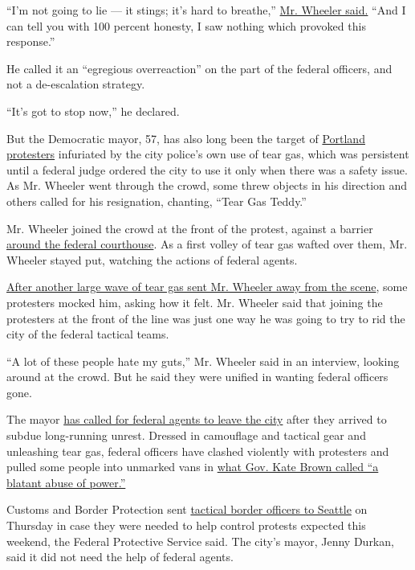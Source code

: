 ``I'm not going to lie --- it stings; it's hard to breathe,''
\href{https://twitter.com/ByMikeBaker/status/1286186731763412993}{Mr.
Wheeler said.} ``And I can tell you with 100 percent honesty, I saw
nothing which provoked this response.''

He called it an ``egregious overreaction'' on the part of the federal
officers, and not a de-escalation strategy.

``It's got to stop now,'' he declared.

But the Democratic mayor, 57, has also long been the target of
\href{https://www.nytimes.com/article/portland-protests-explained-protesters.html}{Portland
protesters} infuriated by the city police's own use of tear gas, which
was persistent until a federal judge ordered the city to use it only
when there was a safety issue. As Mr. Wheeler went through the crowd,
some threw objects in his direction and others called for his
resignation, chanting, ``Tear Gas Teddy.''

Mr. Wheeler joined the crowd at the front of the protest, against a
barrier
\href{https://www.nytimes.com/2020/07/22/us/portland-protests-courthouse.html}{around
the federal courthouse}. As a first volley of tear gas wafted over them,
Mr. Wheeler stayed put, watching the actions of federal agents.

\href{https://twitter.com/ByMikeBaker/status/1286194497559252992}{After
another large wave of tear gas sent Mr. Wheeler away from the scene},
some protesters mocked him, asking how it felt. Mr. Wheeler said that
joining the protesters at the front of the line was just one way he was
going to try to rid the city of the federal tactical teams.

``A lot of these people hate my guts,'' Mr. Wheeler said in an
interview, looking around at the crowd. But he said they were unified in
wanting federal officers gone.

The mayor
\href{https://www.nytimes.com/2020/07/21/us/portland-protests.html}{has
called for federal agents to leave the city} after they arrived to
subdue long-running unrest. Dressed in camouflage and tactical gear and
unleashing tear gas, federal officers have clashed violently with
protesters and pulled some people into unmarked vans in
\href{https://www.nytimes.com/2020/07/17/us/portland-protests.html}{what
Gov. Kate Brown called ``a blatant abuse of power.''}

Customs and Border Protection sent
\href{https://www.nytimes.com/2020/07/23/us/seattle-federal-agents-police.html}{tactical
border officers to Seattle} on Thursday in case they were needed to help
control protests expected this weekend, the Federal Protective Service
said. The city's mayor, Jenny Durkan, said it did not need the help of
federal agents.


